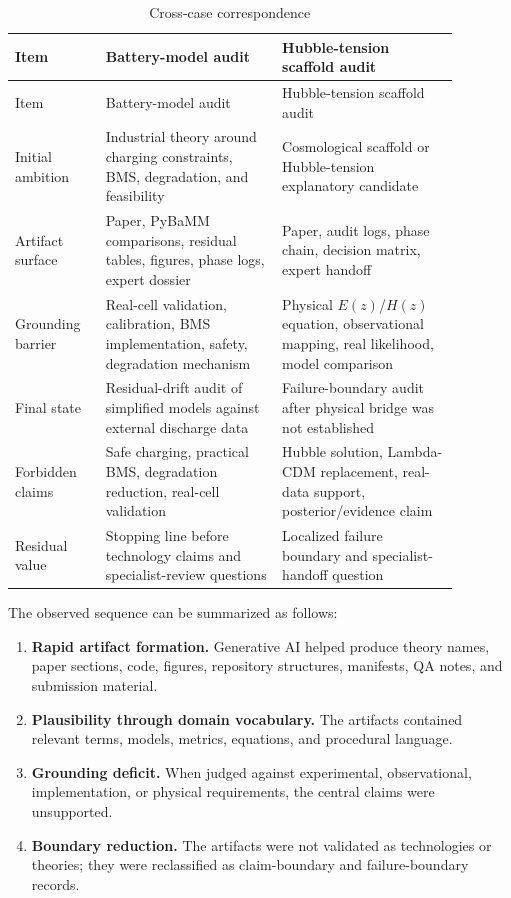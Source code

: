 \documentclass[a4paper,11pt]{article}
\begin{document}
\begin{longtable}{p{0.18\linewidth}p{0.35\linewidth}p{0.35\linewidth}}
\caption{Cross-case correspondence}\label{tab:cases}\\
\toprule
Item & Battery-model audit & Hubble-tension scaffold audit\\
\midrule
\endfirsthead
\toprule
Item & Battery-model audit & Hubble-tension scaffold audit\\
\midrule
\endhead
Initial ambition & Industrial theory around charging constraints, BMS, degradation, and feasibility & Cosmological scaffold or Hubble-tension explanatory candidate\\
Artifact surface & Paper, PyBaMM comparisons, residual tables, figures, phase logs, expert dossier & Paper, audit logs, phase chain, decision matrix, expert handoff\\
Grounding barrier & Real-cell validation, calibration, BMS implementation, safety, degradation mechanism & Physical $E(z)$/$H(z)$ equation, observational mapping, real likelihood, model comparison\\
Final state & Residual-drift audit of simplified models against external discharge data & Failure-boundary audit after physical bridge was not established\\
Forbidden claims & Safe charging, practical BMS, degradation reduction, real-cell validation & Hubble solution, Lambda-CDM replacement, real-data support, posterior/evidence claim\\
Residual value & Stopping line before technology claims and specialist-review questions & Localized failure boundary and specialist-handoff question\\
\bottomrule
\end{longtable}

The observed sequence can be summarized as follows:

\begin{enumerate}[leftmargin=2em]
  \item \textbf{Rapid artifact formation.} Generative AI helped produce theory names, paper sections, code, figures, repository structures, manifests, QA notes, and submission material.
  \item \textbf{Plausibility through domain vocabulary.} The artifacts contained relevant terms, models, metrics, equations, and procedural language.
  \item \textbf{Grounding deficit.} When judged against experimental, observational, implementation, or physical requirements, the central claims were unsupported.
  \item \textbf{Boundary reduction.} The artifacts were not validated as technologies or theories; they were reclassified as claim-boundary and failure-boundary records.
\end{enumerate}
\end{document}
